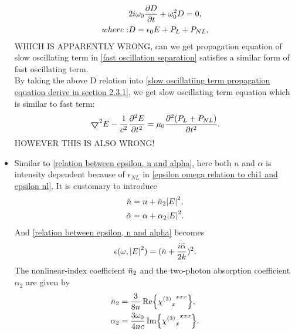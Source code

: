 \documentclass[12pt]{extarticle}
\numberwithin{equation}{section}
\numberwithin{figure}{section}
\numberwithin{table}{section}
\newcommand{\<}{\langle}
\renewcommand{\>}{\rangle}
\theoremstyle{definition}
\newcommand{\Lap}{\boldsymbol{\bigtriangledown}}
\newcommand{\chiThree}{{{\chi^{(3)}}_x}^{xxx}}
\begin{document}
\begin{itemize}
                \begin{subequations}
                \begin{align*}
                    &2i\omega_0\pdv{D}{t}+\omega_0^2 D=0,\\
                    where: & D = \epsilon_0 E +P_L+P_{NL},
                \end{align*}
                \label{D approximation in section 2.3.1}
                \end{subequations}
                \MakeUppercase{which is apparently wrong,} can we get propagation equation of slow oscillating term in \autoref{fast oscillation separation} satisfies a similar form of fast oscillating term.\\ By taking the above D relation into \autoref{slow oscillatiing term propagation equation derive in section 2.3.1}, we get slow oscillating term equation which is similar to fast term:
                \begin{equation*}
                    \Lap^2E-\frac{1}{c^2}\pdv[2]{E}{t}=\mu_0\pdv[2]{(P_L+P_{NL})}{t}.
                \end{equation*}
                \MakeUppercase{However this is also wrong!}
            \item Similar to \autoref{relation between epsilon, n and alpha}, here both $n$ and $\alpha$ is intensity dependent because of $\epsilon_{NL}$ in \autoref{epsilon omega relation to chi1 and epsilon nl}. It is customary to introduce
            \begin{subequations}
                \begin{align}
                    \Tilde{n}&=n+\Bar{n}_2\abs{E}^2,\label{tilde n and n n2 relation}\\
                    \Tilde{\alpha}&=\alpha+\alpha_2\abs{E}^2\label{tilde alpha and alpha alpha2 relation}.
                \end{align}
            \end{subequations}
            And \autoref{relation between epsilon, n and alpha} becomes
            \begin{equation}
                \epsilon(\omega, \abs{E}^2) = (\Tilde{n}+\frac{i\Tilde{\alpha}}{2k})^2.
                \label{relation between tilde epsilon, tilde n and tilde alpha}
            \end{equation}
            The nonlinear-index coefficient $\Bar{n}_2$ and the two-photon absorption coefficient $\alpha_2$ are given by
            \begin{subequations}
                \begin{align}
                    \Bar{n}_2&=\frac{3}{8n}\Re{\chiThree},\label{nonlinear-index coefficient bar n2 relation to chi3}\\
                    \alpha_2&=\frac{3\omega_0}{4nc}\Im{\chiThree} \label{two-photon absorption coefficient alpha2 relation to chi3}.
                \end{align}
            \end{subequations}
            

\end{itemize}
\end{document}
